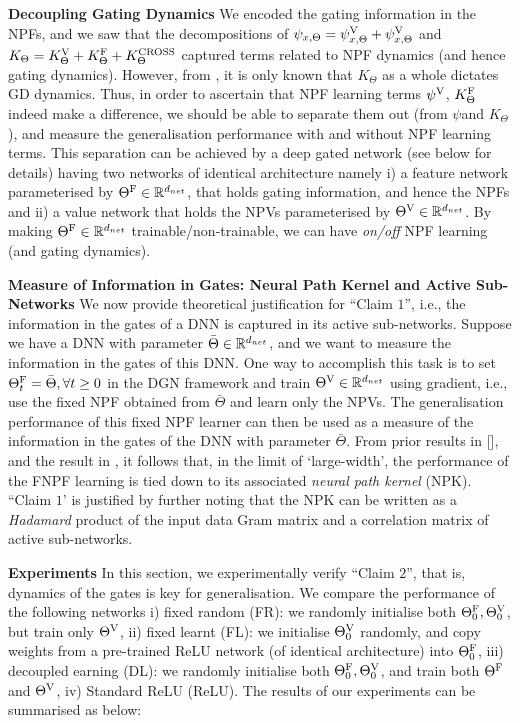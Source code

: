 \documentclass{article}
\begin{document}
\textbf{Decoupling Gating Dynamics} We encoded the gating information in the NPFs, and we saw that the decompositions of $\psi_{x,\Theta}=\psi^{\text{V}}_{x,\Theta}+\psi^{\text{V}}_{x,\Theta}$ and $K_{\Theta}=K^{\text{V}}_{\Theta}+K^{\text{F}}_{\Theta}+K^{\text{CROSS}}_{\Theta}$ captured terms related to NPF dynamics (and hence gating dynamics). However, from , it is only known that $K_{\Theta}$ as a whole dictates GD dynamics. Thus, in order to ascertain that NPF learning terms $\psi^{\text{V}}$, $K^{\text{F}}_{\Theta}$ indeed make a difference, we should be able to separate them out (from $\psi$and $K_{\Theta}$), and measure the generalisation performance with and without NPF learning terms. This separation can be achieved by a deep gated network (see  below for details) having two networks of identical architecture namely i) a feature network parameterised by ${\Theta}^{\text{F}}\in\mathbb{R}^{d_{net}}$, that holds gating information, and hence the NPFs and ii) a value network that holds the NPVs parameterised by ${\Theta}^{\text{V}}\in\mathbb{R}^{d_{net}}$.  By making ${\Theta}^{\text{F}}\in\mathbb{R}^{d_{net}}$ trainable/non-trainable, we can have \emph{on/off} NPF learning (and gating dynamics).

\textbf{Measure of Information in Gates: Neural Path Kernel and Active Sub-Networks}
We now provide theoretical justification for ``Claim $1$'', i.e., the information in the gates of a DNN is captured in its active sub-networks. Suppose we have a DNN with parameter $\bar{\Theta}\in\mathbb{R}^{d_{net}}$, and we want to measure the information in the gates of this DNN. One way to accomplish this task is to set ${\Theta}^{\text{F}}_t=\bar{\Theta},\forall t\geq 0$ in the DGN framework and train ${\Theta}^{\text{V}}\in\mathbb{R}^{d_{net}}$ using gradient, i.e., use the fixed NPF obtained from $\bar{\Theta}$ and learn only the NPVs. The generalisation performance of this fixed NPF learner can then be used as a measure of the information in the gates of the DNN with parameter $\bar{\Theta}$.  From prior results in [], and the result in , it follows that, in the limit of `large-width', the performance of the FNPF learning is tied down to its associated \emph{neural path kernel} (NPK). ``Claim $1$' is justified by further noting that the NPK can be written as a \emph{Hadamard} product of the input data Gram matrix and a correlation matrix of active sub-networks.


\textbf{Experiments} In this section, we experimentally verify ``Claim $2$'', that is, dynamics of the gates is key for generalisation. We compare the performance of the following networks i) fixed random (FR): we randomly initialise both ${\Theta}^{\text{F}}_0,{\Theta}^{\text{V}}_0$, but train only ${\Theta}^{\text{V}}$, ii) fixed learnt (FL): we initialise ${\Theta}^{\text{V}}_0$ randomly, and copy weights from a pre-trained ReLU network (of identical architecture) into ${\Theta}^{\text{F}}_0$, iii) decoupled earning (DL):  we randomly initialise both ${\Theta}^{\text{F}}_0,{\Theta}^{\text{V}}_0$, and train both ${\Theta}^{\text{F}}$ and ${\Theta}^{\text{V}}$, iv) Standard ReLU (ReLU).  The results of our experiments can be summarised as below:
\end{document}
